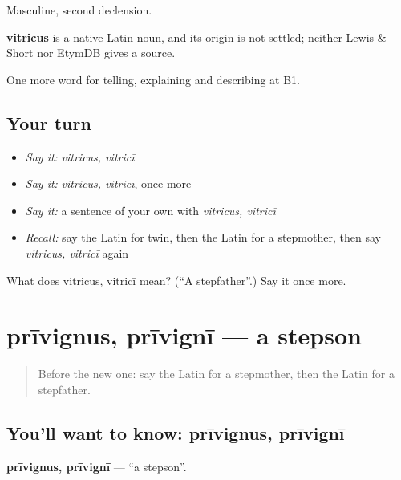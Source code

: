 Masculine, second declension.

\begin{cousinweb}
\textbf{vitricus} is a native Latin noun, and its origin is not settled; neither Lewis \& Short nor EtymDB gives a source.
\end{cousinweb}

\begin{grammarlens}[title={What you've built}]
One more word for telling, explaining and describing at B1.
\end{grammarlens}

\subsection*{Your turn}
\begin{itemize}
\raggedright
  \item \emph{Say it:} \emph{vitricus, vitricī}
  \item \emph{Say it:} \emph{vitricus, vitricī}, once more
  \item \emph{Say it:} a sentence of your own with \emph{vitricus, vitricī}
  \item \emph{Recall:} say the Latin for twin, then the Latin for a stepmother, then say \emph{vitricus, vitricī} again
\end{itemize}

\begin{tcolorbox}[breakable,colback=teal!4,colframe=teal!35!black,title={Before you move on}]
What does vitricus, vitricī mean? (\textquotedblleft{}A stepfather\textquotedblright{}.) Say it once more.
\end{tcolorbox}
\section[prīvignus, prīvignī]{prīvignus, prīvignī — a stepson}

\label{lesson:LA-C529-privignus}



\begin{quote}
Before the new one: say the Latin for a stepmother, then the Latin for a stepfather.
\end{quote}

\subsection*{You'll want to know: prīvignus, prīvignī}
\textbf{prīvignus, prīvignī} — \textquotedblleft{}a stepson\textquotedblright{}.

